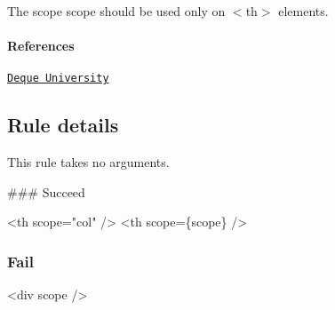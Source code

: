 The {\ttfamily scope} scope should be used only on {\ttfamily $<$th$>$} elements.

\paragraph*{References}


\begin{DoxyEnumerate}
\item \href{https://dequeuniversity.com/rules/axe/1.1/scope}{\tt Deque University}
\end{DoxyEnumerate}

\subsection*{Rule details}

This rule takes no arguments.

\#\#\# Succeed 
\begin{DoxyCode}
<th scope="col" />
<th scope=\{scope\} />
\end{DoxyCode}


\subsubsection*{Fail}


\begin{DoxyCode}
<div scope />
\end{DoxyCode}
 